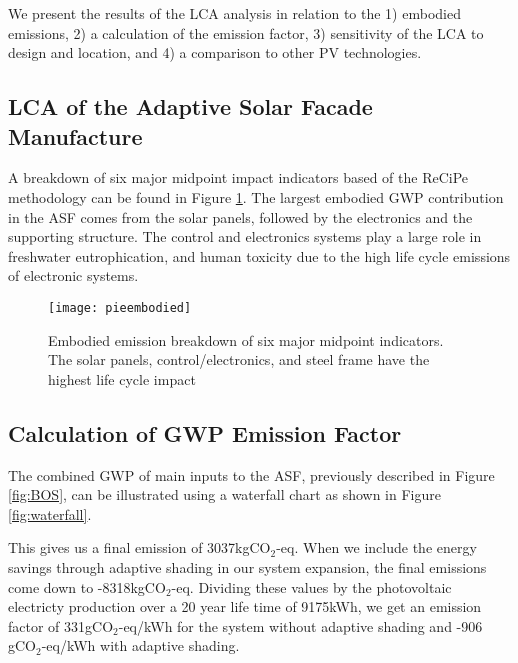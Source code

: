 
We present the results of the LCA analysis in relation to the 1) embodied  emissions, 2) a calculation of the emission factor, 3) sensitivity of the LCA to design and location, and 4) a comparison to other PV technologies.

\subsection{LCA of the Adaptive Solar Facade Manufacture}

A breakdown of six major midpoint impact indicators based of the ReCiPe methodology \cite{goedkoop2009recipe}  can be found in Figure  \ref{fig:embodied}. The largest embodied GWP contribution in the ASF comes from the solar panels, followed by the electronics and the supporting structure. The control and electronics systems play a large role in freshwater eutrophication, and human toxicity due to the high life cycle emissions of electronic systems.



\begin{figure}[H]
\begin{center}
\texttt{[image: pieembodied]}
\caption{Embodied emission breakdown of six major midpoint indicators. The solar panels, control/electronics, and steel frame have the highest life cycle impact}
\label{fig:embodied}
\end{center}
\end{figure}

\subsection{Calculation of GWP Emission Factor}
The combined GWP of main inputs to the ASF, previously described in Figure \ref{fig:BOS}, can be illustrated using a waterfall chart as shown in Figure \ref{fig:waterfall}. 


This gives us a final emission of 3037kgCO$_2$-eq. When we include the energy savings through adaptive shading in our system expansion, the final emissions come down to -8318kgCO$_2$-eq. Dividing these values by the photovoltaic electricty production over a 20 year life time of 9175kWh, we get an emission factor of 331gCO$_2$-eq/kWh for the system without adaptive shading and -906 gCO$_2$-eq/kWh with adaptive shading.


